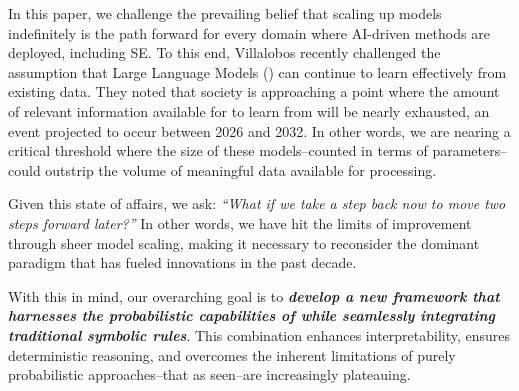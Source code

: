 


In this paper, we challenge the prevailing belief that scaling up models indefinitely is the path forward for every domain where AI-driven methods are deployed, including SE. 
To this end, Villalobos \etal \cite{villalobosposition} recently challenged the assumption that Large Language Models (\llms) can continue to learn effectively from existing data. They noted that society is approaching a point where the amount of relevant information available for \llms to learn from will be nearly exhausted, an event projected to occur between 2026 and 2032. In other words, we are nearing a critical threshold where the size of these models--counted in terms of parameters--could outstrip the volume of meaningful data available for processing.

Given this state of affairs, we ask: \emph{``What if we take a step back now to move two steps forward later?''} In other words, we have hit the limits of improvement through sheer model scaling, making it necessary to reconsider the dominant paradigm that has fueled innovations in the past decade.

With this in mind, our overarching goal is to \textbf{\emph{develop a new framework that harnesses the probabilistic capabilities of \llms while seamlessly integrating traditional symbolic rules}}. This combination enhances interpretability, ensures deterministic reasoning, and overcomes the inherent limitations of purely probabilistic approaches--that as seen--are increasingly plateauing.



